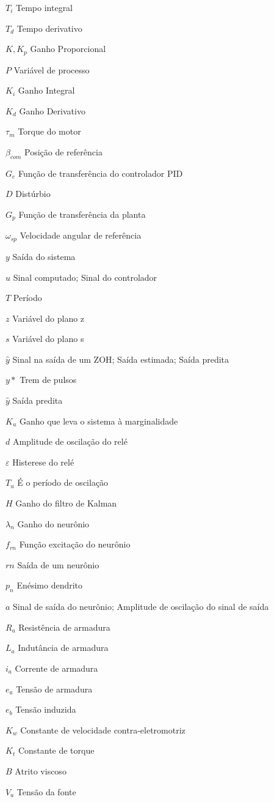 \begin{simbolos}
  \item[$T_i$] Tempo integral
  \item[$T_d$] Tempo derivativo
  \item[$K, K_p$] Ganho Proporcional
  \item[$P$] Variável de processo
  \item[$K_i$] Ganho Integral
  \item[$K_d$] Ganho Derivativo
  \item[$\tau_m$] Torque do motor
  \item[$\beta_{com}$] Posição de referência
  \item[$G_e$] Função de transferência do controlador PID
  \item[$D$] Distúrbio
  \item[$G_p$] Função de transferência da planta
  \item[$\omega_{sp}$] Velocidade angular de referência
  \item[$y$] Saída do sistema
  \item[$u$] Sinal computado; Sinal do controlador
  \item[$T$] Período
  \item[$z$] Variável do plano z
  \item[$s$] Variável do plano s
  \item[$\hat{y}$] Sinal na saída de um ZOH; Saída estimada; Saída predita
  \item[$y*$] Trem de pulsos
  \item[$\hat{y}$] Saída predita
  \item[$K_u$] Ganho que leva o sistema à marginalidade
  \item[$d$] Amplitude de oscilação do relé
  \item[$\varepsilon$] Histerese do relé
  \item[$T_u$] É o período de oscilação
  \item[$H$] Ganho do filtro de Kalman
  \item[$\lambda_n$] Ganho do neurônio
  \item[$f_{rn}$] Função excitação do neurônio
  \item[$rn$] Saída de um neurônio
  \item[$p_n$] Enésimo dendrito
  \item[$a$] Sinal de saída do neurônio; Amplitude de oscilação do sinal de saída
  \item[$R_a$] Resistência de armadura
  \item[$L_a$] Indutância de armadura
  \item[$i_a$] Corrente de armadura
  \item[$e_a$] Tensão de armadura
  \item[$e_b$] Tensão induzida
  \item[$K_w$] Constante de velocidade contra-eletromotriz 
  \item[$K_t$] Constante de torque
  \item[$B$] Atrito viscoso
  \item[$V_a$] Tensão da fonte
\end{simbolos}